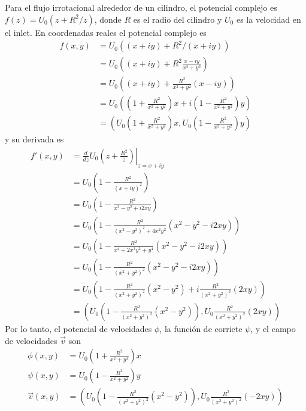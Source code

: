 \documentclass{article}
\theoremstyle{remark}
\begin{document}
  Para el flujo irrotacional alrededor de un cilindro, el potencial complejo es \(f(z) = U_0 (z + R^2 / z)\), donde \(R\) es el radio del cilindro y \(U_0\) es la velocidad en el inlet.
  En coordenadas reales el potencial complejo es
  \begin{align}
    f(x, y)
    &=
    U_0 \left( (x + i y) + R^2 / (x + i y) \right)
    \\
    &=
    U_0 \left( (x + i y) + R^2 \frac{x - i y}{x^2 + y^2} \right)
    \\
    &=
    U_0 \left( (x + i y) + \frac{R^2}{x^2 + y^2} (x - i y) \right)
    \\
    &=
    U_0 \left( \left( 1 + \frac{R^2}{x^2 + y^2} \right) x + i \left( 1 - \frac{R^2}{x^2 + y^2} \right) y \right)
    \\
    &=
    \left(
      U_0 \left( 1 + \frac{R^2}{x^2 + y^2} \right) x,
      U_0 \left( 1 - \frac{R^2}{x^2 + y^2} \right) y
    \right)
  \end{align}
  y su derivada es
  \begin{align}
    f'(x, y)
    &=
    \left. \frac{d}{d z} U_0 \left( z + \frac{R^2}{z} \right) \right\vert_{z = x + i y}
    \\
    &=
    U_0 \left( 1 - \frac{R^2}{(x + i y)^2} \right)
    \\
    &=
    U_0 \left( 1 - \frac{R^2}{x^2 - y^2 + i 2 x y} \right)
    \\
    &=
    U_0 \left( 1 - \frac{R^2}{(x^2 - y^2)^2 + 4 x^2 y^2} (x^2 - y^2 - i 2 x y) \right)
    \\
    &=
    U_0 \left( 1 - \frac{R^2}{x^4 + 2 x^2 y^2 + y^4} (x^2 - y^2 - i 2 x y) \right)
    \\
    &=
    U_0 \left( 1 - \frac{R^2}{(x^2 + y^2)^2} (x^2 - y^2 - i 2 x y) \right)
    \\
    &=
    U_0 \left( 1 - \frac{R^2}{(x^2 + y^2)^2} (x^2 - y^2) + i \frac{R^2}{(x^2 + y^2)^2} (2 x y) \right)
    \\
    &=
    \left(
      U_0 \left( 1 - \frac{R^2}{(x^2 + y^2)^2} (x^2 - y^2) \right),
      U_0 \frac{R^2}{(x^2 + y^2)^2} (2 x y)
    \right)
  \end{align}
  Por lo tanto, el potencial de velocidades \(\phi\), la función de corriete \(\psi\), y el campo de velocidades \(\vec{v}\) son
  \begin{align}
    \phi(x, y)
    &=
    U_0 \left( 1 + \frac{R^2}{x^2 + y^2} \right) x \\
    \psi(x, y)
    &=
    U_0 \left( 1 - \frac{R^2}{x^2 + y^2} \right) y
    \\
    \vec{v}(x, y)
    &=
    \left(
      U_0 \left( 1 - \frac{R^2}{(x^2 + y^2)^2} (x^2 - y^2) \right),
      U_0 \frac{R^2}{(x^2 + y^2)^2} (- 2 x y)
    \right)
  \end{align}
  
\end{document}
